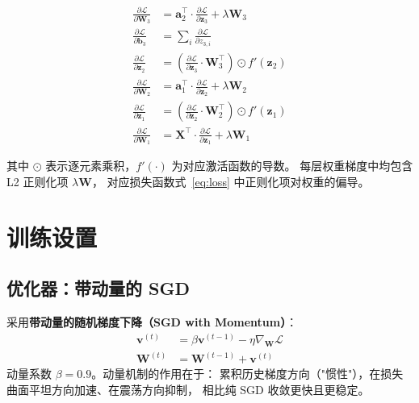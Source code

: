 \documentclass[12pt, a4paper]{article}
\begin{document}
\begin{align}
  \frac{\partial\mathcal{L}}{\partial\mathbf{W}_3} &= \mathbf{a}_2^\top \cdot \frac{\partial\mathcal{L}}{\partial\mathbf{z}_3} + \lambda\mathbf{W}_3
  \label{eq:dW3}\\
  \frac{\partial\mathcal{L}}{\partial\mathbf{b}_3} &= \sum_i \frac{\partial\mathcal{L}}{\partial z_{3,i}}
  \label{eq:db3}\\
  \frac{\partial\mathcal{L}}{\partial\mathbf{z}_2} &= \left(\frac{\partial\mathcal{L}}{\partial\mathbf{z}_3}\cdot\mathbf{W}_3^\top\right) \odot f'(\mathbf{z}_2)
  \label{eq:dz2}\\
  \frac{\partial\mathcal{L}}{\partial\mathbf{W}_2} &= \mathbf{a}_1^\top \cdot \frac{\partial\mathcal{L}}{\partial\mathbf{z}_2} + \lambda\mathbf{W}_2
  \label{eq:dW2}\\
  \frac{\partial\mathcal{L}}{\partial\mathbf{z}_1} &= \left(\frac{\partial\mathcal{L}}{\partial\mathbf{z}_2}\cdot\mathbf{W}_2^\top\right) \odot f'(\mathbf{z}_1)
  \label{eq:dz1}\\
  \frac{\partial\mathcal{L}}{\partial\mathbf{W}_1} &= \mathbf{X}^\top \cdot \frac{\partial\mathcal{L}}{\partial\mathbf{z}_1} + \lambda\mathbf{W}_1
  \label{eq:dW1}
\end{align}

其中 $\odot$ 表示逐元素乘积，$f'(\cdot)$ 为对应激活函数的导数。
每层权重梯度中均包含 L2 正则化项 $\lambda\mathbf{W}$，
对应损失函数式~\eqref{eq:loss} 中正则化项对权重的偏导。

\section{训练设置}

\subsection{优化器：带动量的 SGD}

采用\textbf{带动量的随机梯度下降（SGD with Momentum）}：
\begin{align}
  \mathbf{v}^{(t)} &= \beta \mathbf{v}^{(t-1)} - \eta \nabla_\mathbf{W}\mathcal{L}
  \label{eq:momentum}\\
  \mathbf{W}^{(t)} &= \mathbf{W}^{(t-1)} + \mathbf{v}^{(t)}
  \label{eq:update}
\end{align}
动量系数 $\beta = 0.9$。动量机制的作用在于：
累积历史梯度方向（"惯性"），在损失曲面平坦方向加速、在震荡方向抑制，
相比纯 SGD 收敛更快且更稳定。
\end{document}
